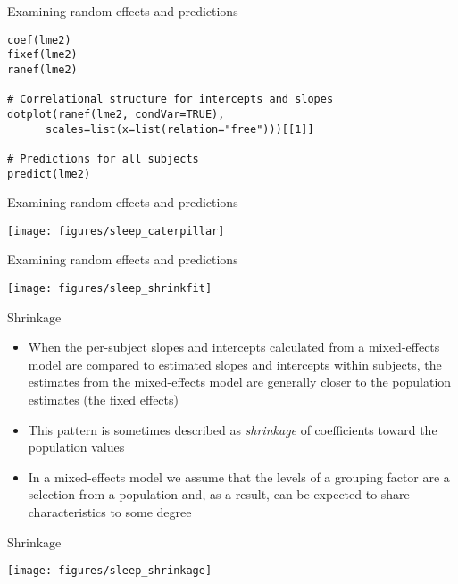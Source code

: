 \documentclass{beamer}
\begin{document}
{

\begin{frame}[fragile]{Examining random effects and predictions}
      \begin{lstlisting}
coef(lme2)
fixef(lme2)
ranef(lme2)

# Correlational structure for intercepts and slopes
dotplot(ranef(lme2, condVar=TRUE),
      scales=list(x=list(relation="free")))[[1]]

# Predictions for all subjects
predict(lme2)
      \end{lstlisting}
\end{frame}

}

\begin{frame}[fragile]{Examining random effects and predictions}
  \begin{center}
    \texttt{[image: figures/sleep\_caterpillar]}
  \end{center}
\end{frame}

\begin{frame}{Examining random effects and predictions}
  \begin{center}
    \texttt{[image: figures/sleep\_shrinkfit]}
  \end{center}
\end{frame}

\begin{frame}{Shrinkage}
  \begin{itemize}
    \item When the per-subject slopes and intercepts calculated from a
      mixed-effects model are compared to estimated slopes and intercepts
      within subjects, the estimates from the mixed-effects model are
      generally closer to the population estimates (the fixed effects)
    \item This pattern is sometimes described as {\it shrinkage} of
      coefficients toward the population values
    \item In a mixed-effects model we assume that the levels of a grouping
      factor are a selection from a population and, as a result, can be
      expected to share characteristics to some degree
  \end{itemize}
\end{frame}

\begin{frame}{Shrinkage}
  \begin{center}
    \texttt{[image: figures/sleep\_shrinkage]}
  \end{center}
\end{frame}
\end{document}
